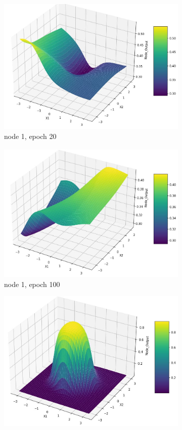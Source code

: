 \documentclass[11pt]{article}
\begin{document}
\begin{figure}[h!]
\begin{subfigure}[b]{0.30\textwidth}
	\includegraphics[scale=0.14]{output_n1_e20.jpg}
	\caption{node 1, epoch 20}
	\label{fig:fig2.1.3.3}
	\end{subfigure}
	\begin{subfigure}[b]{0.45\textwidth}
	\centering
	\includegraphics[scale=0.14]{output_n1_e100.jpg}
	\caption{node 1, epoch 100}
	\label{fig:fig2.1.3.4}
	\end{subfigure}
	\begin{subfigure}[b]{0.45\textwidth}
	\centering
	\includegraphics[scale=0.14]{output_n1_c.jpg}

\end{subfigure}
\end{figure}
\end{document}
